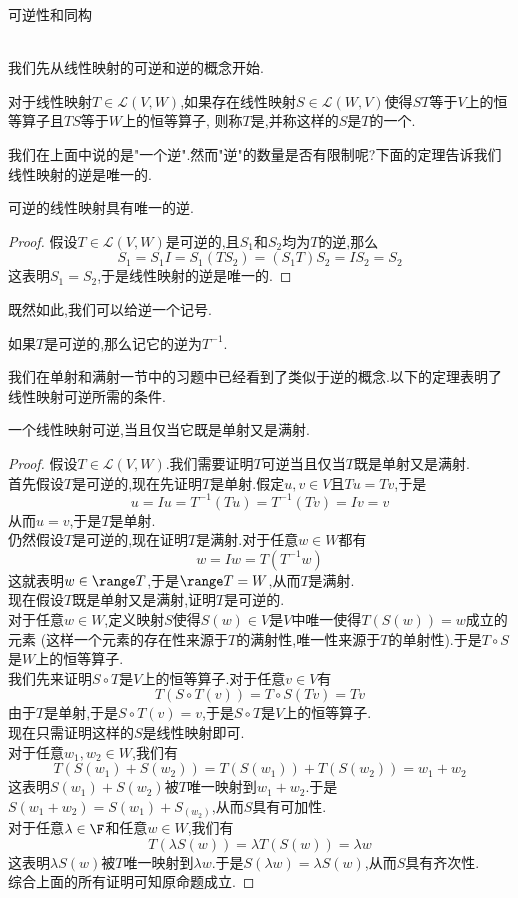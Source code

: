 \documentclass{ctexart}
\begin{document}
\pagestyle{empty}
\begin{center}\large 可逆性和同构\end{center}
\\
我们先从线性映射的可逆和逆的概念开始.
\begin{definition}[1.1 定义:可逆的,逆]
    对于线性映射$T\in\mathcal{L}(V,W)$,如果存在线性映射$S\in\mathcal{L}(W,V)$使得$ST$等于$V$上的恒等算子且$TS$等于$W$上的恒等算子,
    则称$T$是,并称这样的$S$是$T$的一个.
\end{definition}\noindent
我们在上面中说的是"一个逆".然而"逆"的数量是否有限制呢?下面的定理告诉我们线性映射的逆是唯一的.
\begin{formal}[1.2 逆的唯一性]
    可逆的线性映射具有唯一的逆.
\end{formal}
\begin{proof}
    假设$T\in\mathcal{L}(V,W)$是可逆的,且$S_1$和$S_2$均为$T$的逆,那么
    $$S_1=S_1I=S_1(TS_2)=(S_1T)S_2=IS_2=S_2$$
    这表明$S_1=S_2$,于是线性映射的逆是唯一的.
\end{proof}\noindent
既然如此,我们可以给逆一个记号.
\begin{definition}[1.3 记号:逆]
    如果$T$是可逆的,那么记它的逆为$T^{-1}$.
\end{definition}\noindent
我们在单射和满射一节中的习题中已经看到了类似于逆的概念.以下的定理表明了线性映射可逆所需的条件.
\begin{formal}[1.4 可逆的判定]
    一个线性映射可逆,当且仅当它既是单射又是满射.
\end{formal}
\begin{proof}
    假设$T\in\mathcal{L}(V,W)$.我们需要证明$T$可逆当且仅当$T$既是单射又是满射.\\
    首先假设$T$是可逆的,现在先证明$T$是单射.假定$u,v\in V$且$Tu=Tv$,于是
    $$u=Iu=T^{-1}(Tu)=T^{-1}(Tv)=Iv=v$$
    从而$u=v$,于是$T$是单射.\\
    仍然假设$T$是可逆的,现在证明$T$是满射.对于任意$w\in W$都有
    $$w=Iw=T(T^{-1}w)$$
    这就表明$w\in\range T$,于是$\range T=W$,从而$T$是满射.\\
    现在假设$T$既是单射又是满射,证明$T$是可逆的.\\
    对于任意$w\in W$,定义映射$S$使得$S(w)\in V$是$V$中唯一使得$T(S(w))=w$成立的元素
    (这样一个元素的存在性来源于$T$的满射性,唯一性来源于$T$的单射性).于是$T\circ S$是$W$上的恒等算子.\\
    我们先来证明$S\circ T$是$V$上的恒等算子.对于任意$v\in V$有
    $$T(S\circ T(v))=T\circ S(Tv)=Tv$$
    由于$T$是单射,于是$S\circ T(v)=v$,于是$S\circ T$是$V$上的恒等算子.\\
    现在只需证明这样的$S$是线性映射即可.\\
    对于任意$w_1,w_2\in W$,我们有
    $$T(S(w_1)+S(w_2))=T(S(w_1))+T(S(w_2))=w_1+w_2$$
    这表明$S(w_1)+S(w_2)$被$T$唯一映射到$w_1+w_2$.于是$S(w_1+w_2)=S(w_1)+S_(w_2)$,从而$S$具有可加性.\\
    对于任意$\lambda\in\F$和任意$w\in W$,我们有
    $$T(\lambda S(w))=\lambda T(S(w))=\lambda w$$
    这表明$\lambda S(w)$被$T$唯一映射到$\lambda w$.于是$S(\lambda w)=\lambda S(w)$,从而$S$具有齐次性.\\
    综合上面的所有证明可知原命题成立.
\end{proof}\noindent
\end{document}
